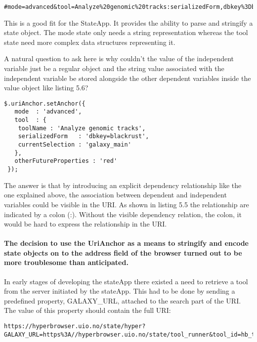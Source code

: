 \documentclass[english]{ifimaster}
\begin{document}
\begin{lstlisting}[caption=Example of a stringified complex object.]
#mode=advanced&tool=Analyze%20genomic%20tracks:serializedForm,dbkey%3Dblackrust
\end{lstlisting}

This is a good fit for the StateApp. It provides the ability to parse and stringify a state object. The mode state only needs a string representation whereas the tool state need more complex data structures representing it. 

A natural question to ask here is why couldn't the value of the independent variable just be a regular object and the string value associated with the independent variable be stored alongside the other dependent variables inside the value object like listing 5.6?

\begin{lstlisting}[caption=Example of a stringified complex object.]
 $.uriAnchor.setAnchor({
   mode  : 'advanced',
   tool  : {
    toolName : 'Analyze genomic tracks',
    serializedForm   : 'dbkey=blackrust',
    currentSelection : 'galaxy_main'
   },
   otherFutureProperties : 'red'
 });
 \end{lstlisting}

The answer is that by introducing an explicit dependency relationship like the one explained above, the association between dependent and independent variables could be visible in the URI. As shown in listing 5.5 the relationship are indicated by a colon (:). Without the visible dependency relation, the colon, it would be hard to express the relationship in the URI. 

\paragraph{The decision to use the UriAnchor as a means to stringify and encode state objects on to the address field of the browser turned out to be more troublesome than anticipated.} In early stages of developing the stateApp there existed a need to retrieve a tool from the server initiated by the stateApp. This had to be done by sending a predefined property, GALAXY\_URL, attached to the search part of the URI. The value of this property should contain the full URI:

\begin{lstlisting}[caption= The full URI to retrieve a hyperbrowser tool.]
https://hyperbrowser.uio.no/state/hyper?GALAXY_URL=https%3A//hyperbrowser.uio.no/state/tool_runner&tool_id=hb_test_1
\end{lstlisting}
\end{document}
